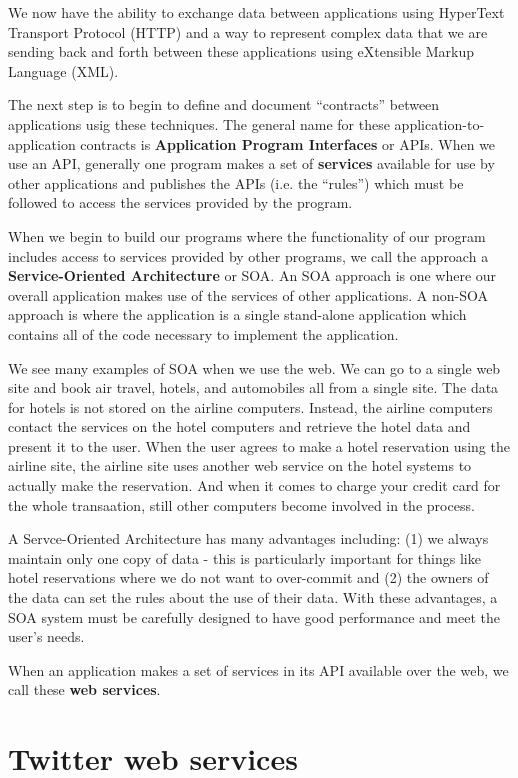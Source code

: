 We now have the ability to exchange data between applications using HyperText
Transport Protocol (HTTP) and a way to represent complex data that we are 
sending back and forth between these applications using eXtensible 
Markup Language (XML).

The next step is to begin to define and document ``contracts'' between 
applications usig these techniques. The general name for these 
application-to-application contracts is {\bf Application Program 
Interfaces} or APIs.  When we use an API, generally one program
makes a set of {\bf services} available for use by other applications
and publishes the APIs (i.e. the ``rules'') which must be followed to 
access the services provided by the program.

When we begin to build our programs where the functionality of
our program includes access to services provided by other programs, 
we call the approach a {\bf Service-Oriented Architecture} or SOA.
An SOA approach is one where our overall application makes use of 
the services of other applications.  A non-SOA approach is where the
application is a single stand-alone application which contains all of the
code necessary to implement the application.

We see many examples of SOA when we use the web.  We can go to a single 
web site and book air travel, hotels, and automobiles all from a 
single site.  The data for hotels is not stored on the airline computers. 
Instead, the airline computers contact the services on the hotel computers
and retrieve the hotel data and present it to the user.  When the user
agrees to make a hotel reservation using the airline site, the airline site uses
another web service on the hotel systems to actually make the reservation.
And when it comes to charge your credit card for the whole transaation, 
still other computers become involved in the process.

A Servce-Oriented Architecture has many advantages including: (1) we 
always maintain only one copy of data - this is particularly important
for things like hotel reservations where we do not want to over-commit
and (2) the owners of the data can set the rules about the use of their 
data.   With these advantages, a SOA system must be carefully designed
to have good performance and meet the user's needs.

When an application makes a set of services in its API available over the web, 
we call these {\bf web services}. 

\section{Twitter web services}

